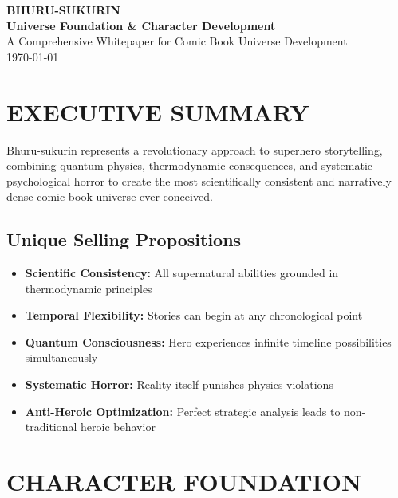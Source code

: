 \documentclass[12pt,a4paper]{article}
\begin{document}
\begin{titlepage}
\centering
\vspace*{2cm}
{\Huge\bfseries\color{darkblue} BHURU-SUKURIN}\\[0.5cm]
{\Large\bfseries Universe Foundation \& Character Development}\\[2cm]
{\large A Comprehensive Whitepaper for Comic Book Universe Development}\\[1cm]
\vfill
{\large \today}
\end{titlepage}

\tableofcontents
\newpage


\section{EXECUTIVE SUMMARY}

\begin{tcolorbox}[colback=lightgray,colframe=darkblue,title=\textbf{Core Concept}]
Bhuru-sukurin represents a revolutionary approach to superhero storytelling, combining quantum physics, thermodynamic consequences, and systematic psychological horror to create the most scientifically consistent and narratively dense comic book universe ever conceived.
\end{tcolorbox}

\subsection{Unique Selling Propositions}
\begin{itemize}
\item \textbf{Scientific Consistency:} All supernatural abilities grounded in thermodynamic principles
\item \textbf{Temporal Flexibility:} Stories can begin at any chronological point
\item \textbf{Quantum Consciousness:} Hero experiences infinite timeline possibilities simultaneously  
\item \textbf{Systematic Horror:} Reality itself punishes physics violations
\item \textbf{Anti-Heroic Optimization:} Perfect strategic analysis leads to non-traditional heroic behavior
\end{itemize}

\section{CHARACTER FOUNDATION}
\end{document}
